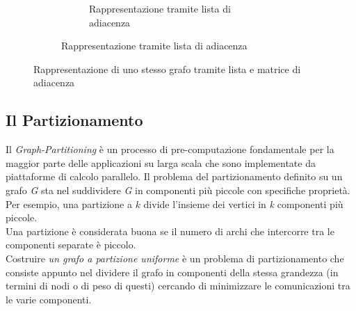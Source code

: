 \begin{figure}[H]
\begin{subfigure}{1.0\textwidth}
\begin{subfigure}{0.5\textwidth}
			\caption{Rappresentazione tramite lista di adiacenza}
			\label{fig:list_adj}
		\end{subfigure}
	\end{subfigure}
	\label{fig:adj_matrix_graph}
	\caption{Rappresentazione di uno stesso grafo tramite lista e matrice di adiacenza}
\end{figure}

\subsection{Il Partizionamento}\label{subsec:partitioning}
Il \textit{Graph-Partitioning} è un processo di pre-computazione fondamentale per la maggior parte delle applicazioni su larga scala che sono implementate da piattaforme di calcolo parallelo. Il problema del partizionamento definito su un grafo \textit{G} sta nel suddividere \textit{G} in componenti più piccole con specifiche proprietà. Per esempio, una partizione a $k$ divide l'insieme dei vertici in \textit{k} componenti più piccole.\\
Una partizione è considerata buona se il numero di archi che intercorre tra le componenti separate è piccolo.\\
Costruire \emph{un grafo a partizione uniforme} è un problema di partizionamento che consiste appunto nel dividere il grafo in componenti della stessa grandezza (in termini di nodi o di peso di questi) cercando di minimizzare le comunicazioni tra le varie componenti.


